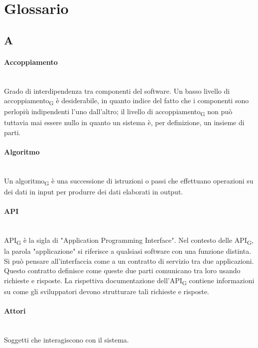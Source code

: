 \section{Glossario}
\subsection*{A}

\paragraph{Accoppiamento}~\smallskip \\
Grado di interdipendenza tra componenti del software. Un basso livello di accoppiamento\textsubscript{G} è desiderabile, in quanto indice del fatto che i componenti sono perlopiù indipendenti l'uno dall'altro; il livello di accoppiamento\textsubscript{G} non può tuttavia mai essere nullo in quanto un sistema è, per definizione, un insieme di parti.

\paragraph{Algoritmo}~\smallskip \\
Un algoritmo\textsubscript{G} è una successione di istruzioni o passi che effettuano operazioni su dei dati in input per produrre dei dati elaborati in output.

\paragraph{API}~\smallskip \\
API\textsubscript{G} è la sigla di "Application Programming Interface". Nel contesto delle API\textsubscript{G}, la parola "applicazione" si riferisce a qualsiasi software con una funzione distinta. Si può pensare all'interfaccia come a un contratto di servizio tra due applicazioni. Questo contratto definisce come queste due parti comunicano tra loro usando richieste e risposte. La rispettiva documentazione dell'API\textsubscript{G} contiene informazioni su come gli sviluppatori devono strutturare tali richieste e risposte.

\paragraph{Attori}~\smallskip \\
Soggetti che interagiscono con il sistema.
\newpage
{}
